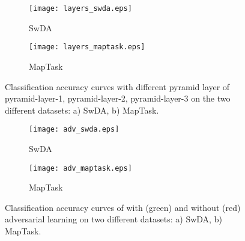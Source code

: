 \documentclass[conference]{IEEEtran}
\begin{document}
	\begin{figure*}[!t]
		\centering
		\begin{subfigure}[b]{3.5in}
			\texttt{[image: layers\_swda.eps]}
			\caption{SwDA}
			\label{fig_varpyramidt_swda}
		\end{subfigure}
		\begin{subfigure}[b]{3.5in}
			\texttt{[image: layers\_maptask.eps]}
			\caption{MapTask}
			\label{fig_varpyramidt_maptask}
		\end{subfigure}
		\caption{Classification accuracy curves with different pyramid layer of pyramid-layer-1, pyramid-layer-2, pyramid-layer-3 on the two different datasets: a) SwDA, b) MapTask.}
		\label{fig_varpyramid}
		\vspace{-0.8em}
	\end{figure*}
	
	\begin{figure*}[!t]
		\centering
		\begin{subfigure}[b]{3.5in}
			\texttt{[image: adv\_swda.eps]}
			\caption{SwDA}
			\label{fig_varadv_swda}
		\end{subfigure}
		\begin{subfigure}[b]{3.5in}
			\texttt{[image: adv\_maptask.eps]}
			\caption{MapTask}
			\label{fig_varadv_maptaskr}
		\end{subfigure}
		\caption{Classification accuracy curves of with (green) and without (red) adversarial learning on two different datasets: a) SwDA, b) MapTask.}
		\label{fig_varadv}
		\vspace{-0.8em}
	\end{figure*}
\end{document}
